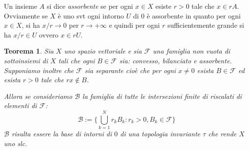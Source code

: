 \documentclass[italian,a4paper,oneside,headinclude]{scrbook}
\newcommand{\B}{\mathcal B}
\newcommand{\F}{\mathcal F}
\newcommand{\defeq}{:=}
\newtheorem{theorem}{Teorema}
\begin{document}
Un insieme $A$ si dice \emph{assorbente} se per ogni $x\in X$ esiste
$r>0$ tale che $x\in rA$.
Ovviamente se $X$ è uno svt
ogni intorno $U$ di $0$ è assorbente
in quanto per ogni $x\in X$, si ha $x/r\to 0$ per $r\to +\infty$ e
quindi per ogni $r$ sufficientemente grande si ha $x/r \in U$ ovvero
$x \in rU$.

\begin{theorem}\label{th:slc_base}
  Sia $X$ uno spazio vettoriale e sia $\F$ una famiglia non vuota di
  sottoinsiemi di $X$ tali che ogni $B\in \F$ sia: convesso,
  bilanciato e assorbente. Supponiamo inoltre che $\F$ sia
  \emph{separante} cioè che per ogni $x\neq 0$ esista $B\in \F$ ed
  esista $r>0$ tale che $rx \not \in B$.

  Allora se consideriamo $\B$ la famiglia di tutte le intersezioni
  finite di riscalati di elementi di $\F$:
  \[
    \B \defeq \{ \bigcup_{k=1}^N r_k B_k \colon r_k>0, B_k\in \F\}
  \]
  $\B$ risulta essere la base di intorni
  di $0$ di una topologia invariante $\tau$ che rende $X$ uno slc.
\end{theorem}
%
\end{document}
